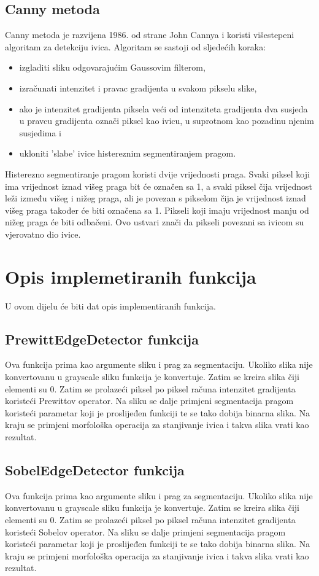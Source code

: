 ﻿\documentclass[conference]{IEEEtran}
\begin{document}
\subsection{Canny metoda}
Canny metoda je razvijena 1986. od strane John Cannya i koristi višestepeni algoritam za detekciju ivica.\cite{b4} Algoritam se sastoji od sljedećih koraka:
\begin{itemize}
    \item izgladiti sliku odgovarajućim Gaussovim filterom,
    \item izračunati intenzitet i pravac gradijenta u svakom pikselu slike,
    \item ako je intenzitet gradijenta piksela veći od intenziteta gradijenta dva susjeda  u pravcu gradijenta označi piksel kao ivicu, u suprotnom kao pozadinu njenim susjedima i 
    \item ukloniti 'slabe' ivice histereznim segmentiranjem pragom.
\end{itemize}
Histerezno segmentiranje pragom koristi dvije vrijednosti praga. Svaki piksel koji ima vrijednost iznad višeg praga bit će označen sa 1, a svaki piksel čija vrijednost leži između višeg i nižeg praga, ali je povezan s pikselom čija je vrijednost iznad višeg praga također će biti označena sa 1. Pikseli koji imaju vrijednost manju od nižeg praga će biti odbačeni. Ovo ustvari znači da pikseli povezani sa ivicom su vjerovatno dio ivice.\cite{b5}
\section{Opis implemetiranih funkcija}
U ovom dijelu će biti dat opis implementiranih funkcija.

 \subsection{PrewittEdgeDetector funkcija}
 Ova funkcija prima kao argumente sliku i prag za segmentaciju. Ukoliko slika nije konvertovanu u grayscale sliku funkcija je konvertuje. Zatim se kreira slika čiji elementi su 0. Zatim se prolazeći piksel po piksel računa intenzitet gradijenta koristeći Prewittov operator. Na sliku  se dalje primjeni segmentacija pragom koristeći parametar koji je proslijeđen funkciji te se tako dobija binarna slika. Na kraju se primjeni morfološka operacija za stanjivanje ivica i takva slika vrati kao rezultat.
 \subsection{SobelEdgeDetector funkcija}
 Ova funkcija prima kao argumente sliku i prag za segmentaciju. Ukoliko slika nije konvertovanu u grayscale sliku funkcija je konvertuje. Zatim se kreira slika čiji elementi su 0. Zatim se prolazeći piksel po piksel računa intenzitet gradijenta koristeći Sobelov operator. Na sliku  se dalje primjeni segmentacija pragom koristeći parametar koji je proslijeđen funkciji te se tako dobija binarna slika. Na kraju se primjeni morfološka operacija za stanjivanje ivica i takva slika vrati kao rezultat.
\end{document}
